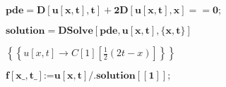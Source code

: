 \documentclass{article}
\begin{document}
\begin{doublespace}
\noindent\(\pmb{\text{pde} = D[u[x,t],t] +2D[u[x,t],x] == 0;}\)
\end{doublespace}

\begin{doublespace}
\noindent\(\pmb{\text{solution} = \text{DSolve}[\text{pde},u[x,t],\{x,t\}]}\)
\end{doublespace}

\begin{doublespace}
\noindent\(\left\{\left\{u[x,t]\to C[1]\left[\frac{1}{2} (2 t-x)\right]\right\}\right\}\)
\end{doublespace}

\begin{doublespace}
\noindent\(\pmb{f[\text{x$\_$},\text{t$\_$}]\text{:=}u[x,t]\text{/.}\text{solution}[[1]];}\)
\end{doublespace}
\end{document}
